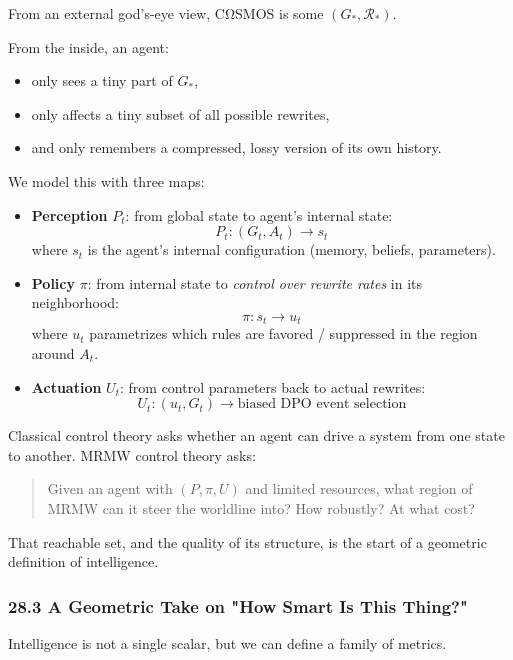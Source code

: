 From an external god’s-eye view, CΩSMOS is some $(G_\ast,\mathcal{R}_\ast)$.

From the inside, an agent:

\begin{itemize}
  \item only sees a tiny part of $G_\ast$,
  \item only affects a tiny subset of all possible rewrites,
  \item and only remembers a compressed, lossy version of its own history.
\end{itemize}

We model this with three maps:

\begin{itemize}
  \item \textbf{Perception} $P_t$: from global state to agent's internal state:
    \[
      P_t : (G_t, A_t) \to s_t
    \]
    where $s_t$ is the agent's internal configuration (memory, beliefs, parameters).

  \item \textbf{Policy} $\pi$: from internal state to \emph{control over rewrite rates} in its neighborhood:
    \[
      \pi : s_t \to u_t
    \]
    where $u_t$ parametrizes which rules are favored / suppressed in the region around $A_t$.

  \item \textbf{Actuation} $U_t$: from control parameters back to actual rewrites:
    \[
      U_t : (u_t, G_t) \to \text{biased DPO event selection}
    \]
\end{itemize}

Classical control theory asks whether an agent can drive a system from one state
to another. MRMW control theory asks:

\begin{quote}
Given an agent with $(P,\pi,U)$ and limited resources, what region of MRMW can it steer the worldline into? How robustly? At what cost?
\end{quote}

That reachable set, and the quality of its structure, is the start of a geometric
definition of intelligence.

\subsubsection*{28.3  A Geometric Take on "How Smart Is This Thing?"}

Intelligence is not a single scalar, but we can define a family of metrics.

